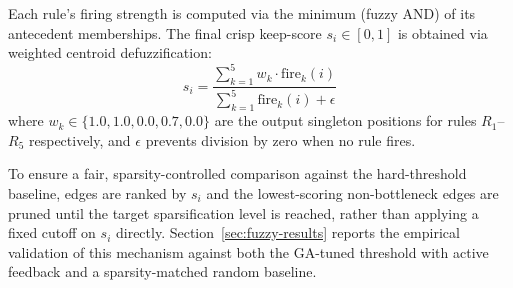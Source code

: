 Each rule's firing strength is computed via the minimum (fuzzy AND) of its antecedent memberships. The final crisp keep-score $s_i \in [0,1]$ is obtained via weighted centroid defuzzification:
\begin{equation}
    s_i = \frac{\sum_{k=1}^{5} w_k \cdot \text{fire}_k(i)}{\sum_{k=1}^{5} \text{fire}_k(i) + \epsilon}
\end{equation}
where $w_k \in \{1.0, 1.0, 0.0, 0.7, 0.0\}$ are the output singleton positions for rules $R_1$--$R_5$ respectively, and $\epsilon$ prevents division by zero when no rule fires.

To ensure a fair, sparsity-controlled comparison against the hard-threshold baseline, edges are ranked by $s_i$ and the lowest-scoring non-bottleneck edges are pruned until the target sparsification level is reached, rather than applying a fixed cutoff on $s_i$ directly. Section~\ref{sec:fuzzy-results} reports the empirical validation of this mechanism against both the GA-tuned threshold with active feedback and a sparsity-matched random baseline.
